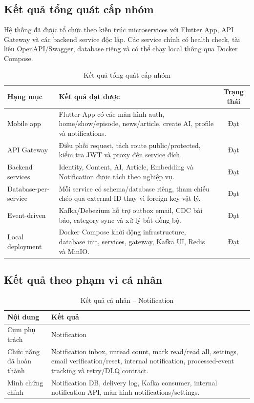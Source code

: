 \documentclass[14pt,a4paper,oneside]{extreport}
\begin{document}
\subsection{Kết quả tổng quát cấp nhóm}

Hệ thống đã được tổ chức theo kiến trúc microservices với Flutter App, API Gateway và các backend service độc lập. Các service chính có health check, tài liệu OpenAPI/Swagger, database riêng và có thể chạy local thông qua Docker Compose.

\begin{table}[H]
\centering
\caption{Kết quả tổng quát cấp nhóm}
\label{tab:ket-qua-tong-quat}
\renewcommand{\arraystretch}{1.3}
\small
\begin{tabularx}{\textwidth}{|l|X|c|}
\hline
\textbf{Hạng mục} & \textbf{Kết quả đạt được} & \textbf{Trạng thái} \\
\hline
Mobile app & Flutter App có các màn hình auth, home/show/episode, news/article, create AI, profile và notifications. & Đạt \\
\hline
API Gateway & Điều phối request, tách route public/protected, kiểm tra JWT và proxy đến service đích. & Đạt \\
\hline
Backend services & Identity, Content, AI, Article, Embedding và Notification được tách theo nghiệp vụ. & Đạt \\
\hline
Database-per-service & Mỗi service có schema/database riêng, tham chiếu chéo qua external ID thay vì foreign key vật lý. & Đạt \\
\hline
Event-driven & Kafka/Debezium hỗ trợ outbox email, CDC bài báo, category sync và xử lý bất đồng bộ. & Đạt \\
\hline
Local deployment & Docker Compose khởi động infrastructure, database init, services, gateway, Kafka UI, Redis và MinIO. & Đạt \\
\hline
\end{tabularx}
\end{table}

\subsection{Kết quả theo phạm vi cá nhân}

\begin{table}[H]
\centering
\caption{Kết quả cá nhân -- Notification}
\label{tab:ket-qua-ca-nhan}
\renewcommand{\arraystretch}{1.3}
\small
\begin{tabularx}{\textwidth}{|l|X|}
\hline
\textbf{Nội dung} & \textbf{Kết quả} \\
\hline
Cụm phụ trách & Notification \\
\hline
Chức năng đã hoàn thành & Notification inbox, unread count, mark read/read all, settings, email verification/reset, internal notification, processed-event tracking và retry/DLQ contract. \\
\hline
Minh chứng chính & Notification DB, delivery log, Kafka consumer, internal notification API, màn hình notifications/settings. \\
\hline
\end{tabularx}
\end{table}
\end{document}
